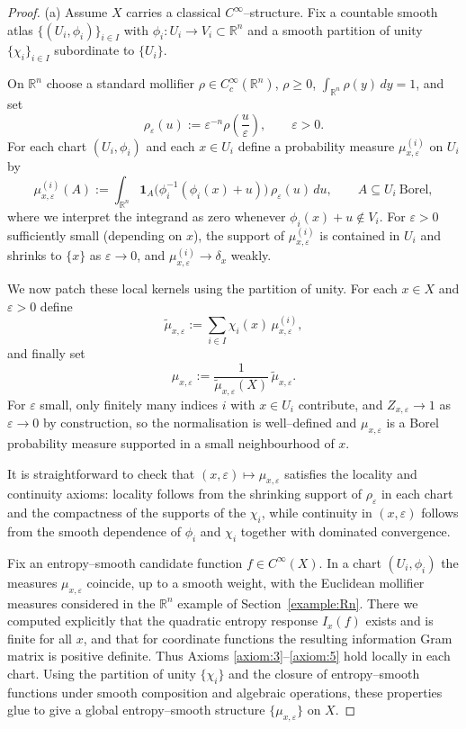 \documentclass[11pt]{amsart}
\theoremstyle{definition}
\theoremstyle{remark}
\begin{document}
\begin{proof}
(a) Assume $X$ carries a classical $C^\infty$–structure. Fix a countable smooth atlas
$\{(U_i,\phi_i)\}_{i\in I}$ with $\phi_i:U_i\to V_i\subset\mathbb{R}^n$ and a smooth partition of
unity $\{\chi_i\}_{i\in I}$ subordinate to $\{U_i\}$.

On $\mathbb{R}^n$ choose a standard mollifier $\rho\in C_c^\infty(\mathbb{R}^n)$, $\rho\ge 0$,
$\int_{\mathbb{R}^n}\rho(y)\,dy=1$, and set
\[
\rho_\varepsilon(u)
:=
\varepsilon^{-n}\rho\!\left(\frac{u}{\varepsilon}\right),
\qquad \varepsilon>0.
\]
For each chart $(U_i,\phi_i)$ and each $x\in U_i$ define a probability measure
$\mu^{(i)}_{x,\varepsilon}$ on $U_i$ by
\[
\mu^{(i)}_{x,\varepsilon}(A)
:=
\int_{\mathbb{R}^n}
\mathbf{1}_A\!\bigl(\phi_i^{-1}(\phi_i(x)+u)\bigr)\,\rho_\varepsilon(u)\,du,
\qquad A\subseteq U_i\ \text{Borel},
\]
where we interpret the integrand as zero whenever $\phi_i(x)+u\notin V_i$. For
$\varepsilon>0$ sufficiently small (depending on $x$), the support of $\mu^{(i)}_{x,\varepsilon}$
is contained in $U_i$ and shrinks to $\{x\}$ as $\varepsilon\to 0$, and
$\mu^{(i)}_{x,\varepsilon}\to\delta_x$ weakly.

We now patch these local kernels using the partition of unity. For each $x\in X$ and
$\varepsilon>0$ define
\[
\widetilde\mu_{x,\varepsilon}
:=
\sum_{i\in I}\chi_i(x)\,\mu^{(i)}_{x,\varepsilon},
\]
and finally set
\[
\mu_{x,\varepsilon}
:=
\frac{1}{\widetilde\mu_{x,\varepsilon}(X)}\,\widetilde\mu_{x,\varepsilon}.
\]
For $\varepsilon$ small, only finitely many indices $i$ with $x\in U_i$ contribute, and
$Z_{x,\varepsilon}\to 1$ as $\varepsilon\to 0$ by construction, so the normalisation is
well–defined and $\mu_{x,\varepsilon}$ is a Borel probability measure supported in a small
neighbourhood of $x$.

It is straightforward to check that $(x,\varepsilon)\mapsto\mu_{x,\varepsilon}$ satisfies
the locality and continuity axioms: locality follows from the shrinking support of
$\rho_\varepsilon$ in each chart and the compactness of the supports of the $\chi_i$, while
continuity in $(x,\varepsilon)$ follows from the smooth dependence of $\phi_i$ and $\chi_i$
together with dominated convergence.

Fix an entropy–smooth candidate function $f\in C^\infty(X)$. In a chart $(U_i,\phi_i)$ the
measures $\mu_{x,\varepsilon}$ coincide, up to a smooth weight, with the Euclidean mollifier
measures considered in the $\mathbb{R}^n$ example of Section~\ref{example:Rn}. There we computed explicitly
that the quadratic entropy response $I_x(f)$ exists and is finite for all $x$, and that for
coordinate functions the resulting information Gram matrix is positive definite. Thus Axioms
\ref{axiom:3}--\ref{axiom:5} hold locally in each chart. Using the partition of unity
$\{\chi_i\}$ and the closure of entropy–smooth functions under smooth composition and algebraic
operations, these properties glue to give a global entropy–smooth structure $\{\mu_{x,\varepsilon}\}$
on $X$.


\end{proof}
\end{document}
